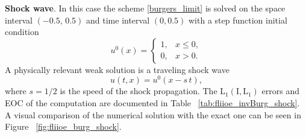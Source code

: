 \documentclass[../include.tex]{subfiles}
\begin{document}
\textbf{Shock wave}. In this case the scheme \eqref{burgers_limit} is solved on the space interval $ (-0.5,\, 0.5) $ and time interval $ (0, 0.5) $ with a step function initial condition
\begin{equation}
	\label{inviscid_shock_sol}
	u^0(x) =
	\begin{cases}
		1, &x\leq 0,\nonumber\\
		0, &x>0.\nonumber
	\end{cases}
\end{equation}
A physically relevant weak solution \cite{olv, lev, whitham} is a traveling shock wave 
\[
u(t,x)=u^0(x - s\,t),
\]
where $ s = 1/2 $ is the speed of the shock propagation. The $ \mathrm{L_1(I,L_1)} $ errors and EOC of the computation are documented in Table ~\ref{tab:fliioe_invBurg_shock}. A visual comparison of the numerical solution with the exact one can be seen in Figure ~\ref{fig:fliioe_burg_shock}.
\end{document}
